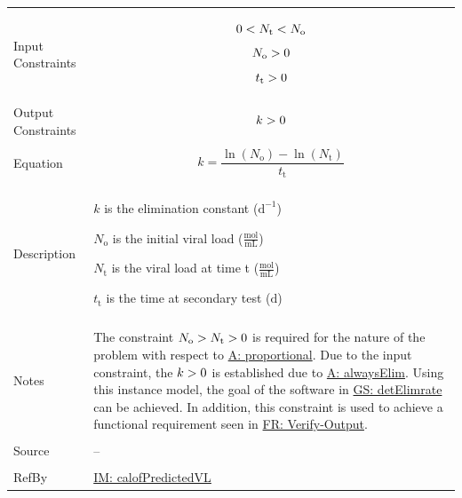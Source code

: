 \documentclass[12pt]{article}
\newcommand{\gt}{\ensuremath >}
\newcommand{\lt}{\ensuremath <}
\begin{document}
\begin{minipage}{\textwidth}
\begin{tabular}{>{\raggedright}p{}>{\raggedright\arraybackslash}p{}}
\\ \midrule \\
Input Constraints & \begin{displaymath}
                    0\lt{}{N_{\text{t}}}\lt{}{N_{\text{o}}}
                    \end{displaymath}
                    \begin{displaymath}
                    {N_{\text{o}}}\gt{}0
                    \end{displaymath}
                    \begin{displaymath}
                    {t_{\text{t}}}\gt{}0
                    \end{displaymath}
\\ \midrule \\
Output Constraints & \begin{displaymath}
                     k\gt{}0
                     \end{displaymath}
\\ \midrule \\
Equation & \begin{displaymath}
           k=\frac{\ln\left({N_{\text{o}}}\right)-\ln\left({N_{\text{t}}}\right)}{{t_{\text{t}}}}
           \end{displaymath}
\\ \midrule \\
Description & \begin{symbDescription}
              \item{$k$ is the elimination constant ($\text{d}^{-1}$)}
              \item{${N_{\text{o}}}$ is the initial viral load ($\frac{\text{mol}}{\text{mL}}$)}
              \item{${N_{\text{t}}}$ is the viral load at time t ($\frac{\text{mol}}{\text{mL}}$)}
              \item{${t_{\text{t}}}$ is the time at secondary test (${\text{d}}$)}
              \end{symbDescription}
\\ \midrule \\
Notes & The constraint ${N_{\text{o}}}\gt{}{N_{\text{t}}}\gt{}0$ is required for the nature of the problem with respect to \hyperref[proportional]{A: proportional}. Due to the input constraint,  the $k\gt{}0$ is established due to \hyperref[alwaysElim]{A: alwaysElim}. Using this instance model, the goal of the software in  \hyperref[detElimrate]{GS: detElimrate}  can be achieved. In addition, this constraint is used to achieve a functional requirement seen in  \hyperref[verifyOutput]{FR: Verify-Output}.
        
\\ \midrule \\
Source & --
         
\\ \midrule \\
RefBy & \hyperref[IM:calofPredictedVL]{IM: calofPredictedVL}
        
\\ \bottomrule
\end{tabular}
\end{minipage}
\end{document}
